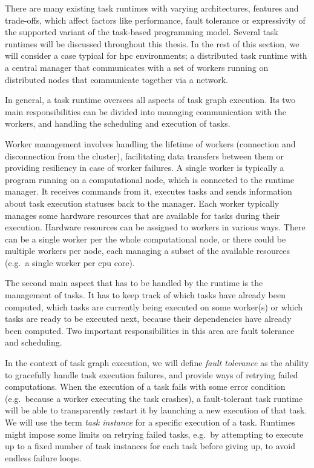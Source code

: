 There are many existing task runtimes with varying architectures, features and trade-offs, which
affect factors like performance, fault tolerance or expressivity of the supported variant of the
task-based programming model. Several task runtimes will be discussed throughout this thesis. In
the rest of this section, we will consider a case typical for \gls{hpc} environments;
a distributed task runtime with a central manager that communicates with a set of workers running
on distributed nodes that communicate together via a network.

In general, a task runtime oversees all aspects of task graph execution. Its two main
responsibilities can be divided into managing communication with the workers, and handling the
scheduling and execution of tasks.

Worker management involves handling the lifetime of workers (connection and disconnection from the
cluster), facilitating data transfers between them or providing resiliency in case of worker
failures. A single worker is typically a program running on a computational node, which is
connected to the runtime manager. It receives commands from it, executes tasks and sends
information about task execution statuses back to the manager. Each worker typically manages some
hardware resources that are available for tasks during their execution. Hardware resources can be
assigned to workers in various ways. There can be a single worker per the whole computational node,
or there could be multiple workers per node, each managing a subset of the available resources
(e.g.\ a single worker per \gls{cpu} core).

The second main aspect that has to be handled by the runtime is the management of tasks. It has to
keep track of which tasks have already been computed, which tasks are currently being executed on
some worker(s) or which tasks are ready to be executed next, because their dependencies have
already been computed. Two important responsibilities in this area are fault tolerance and
scheduling.

In the context of task graph execution, we will define \emph{fault tolerance} as the ability to
gracefully handle task execution failures, and provide ways of retrying failed computations. When
the execution of a task fails with some error condition (e.g.\ because a worker executing the task
crashes), a fault-tolerant task runtime will be able to transparently restart it by launching a new
execution of that task. We will use the term \emph{task instance} for a specific execution of a
task. Runtimes might impose some limits on retrying failed tasks, e.g.\ by attempting to execute up
to a fixed number of task instances for each task before giving up, to avoid endless failure loops.

